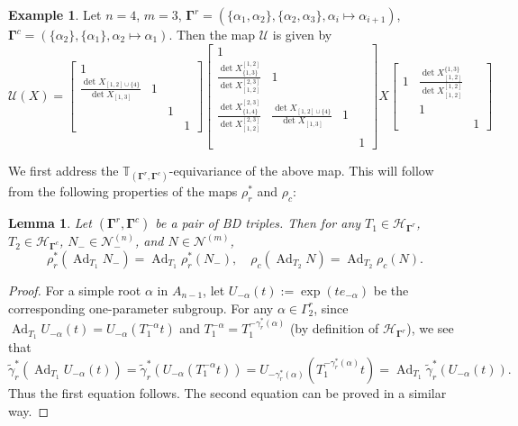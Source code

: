 \documentclass[11pt]{article}
\newcommand{\bg}{\mathbf{\Gamma}}
\DeclareMathOperator{\Ad}{Ad}
\newtheorem{lemma}[theorem]{Lemma}%
\theoremstyle{definition}\newtheorem{definition}[theorem]{Definition}
\theoremstyle{definition}\newtheorem{remark}[theorem]{Remark}
\newtheorem{example}[theorem]{Example}
\theoremstyle{remark}
\numberwithin{equation}{section}
\begin{document}
\begin{example}
    Let $n=4$, $m=3$, $\bg^r = (\{\alpha_1,\alpha_2\},\{\alpha_2,\alpha_3\},\alpha_i \mapsto \alpha_{i+1})$, \mbox{$\bg^c = (\{\alpha_2\},\{\alpha_1\},\alpha_2\mapsto \alpha_1)$}. Then the map $\mathcal{U}$ is given by
    \begin{equation*}
        \mathcal{U}(X) = \begin{bmatrix}
            1 & & &\\
            \frac{\det X_{[1,2]\cup\{4\}}}{\det X_{[1,3]}} & 1 & &\\
            & & 1 &\\
            & & & 1
        \end{bmatrix}
        \begin{bmatrix}
            1 & & &\\
            \frac{\det X_{\{1,3\}}^{[1,2]}}{\det X_{[1,2]}^{[2,3]}} & 1 & &\\[10pt]
            \frac{\det X_{\{1,4\}}^{[2,3]}}{\det X_{[1,2]}^{[2,3]}} &  \frac{\det X_{[1,2]\cup\{4\}}}{\det X_{[1,3]}} & 1 &\\
            & & & 1
        \end{bmatrix}X \begin{bmatrix}
            1 & \frac{\det X_{[1,2]}^{\{1,3\}}}{\det X_{[1,2]}^{[1,2]}} &\\
            & 1 & \\
            & & 1
        \end{bmatrix}
    \end{equation*}
\end{example}

We first address the $\mathbb{T}_{(\bg^r,\bg^c)}$-equivariance of the above map. This will follow from the following properties of the maps $\rho_r^*$ and $\rho_c$:
\begin{lemma}\label{l:T_equiv_rho}
    Let $(\bg^r,\bg^c)$ be a pair of BD triples. Then for any $T_1 \in \mathcal{H}_{\bg^r}$, $T_2 \in \mathcal{H}_{\bg^c}$, $N_- \in \mathcal{N}_-^{(n)}$, and $N \in \mathcal{N}^{(m)}$,
    \begin{equation*}
        \rho_r^*(\Ad_{T_1} N_-) = \Ad_{T_1} \rho_r^*(N_-), \quad \rho_c(\Ad_{T_2} N) = \Ad_{T_2}\rho_c(N).
    \end{equation*}
\end{lemma}
\begin{proof}
For a simple root $\alpha$ in $A_{n-1}$, let $U_{-\alpha}(t):=\exp(t e_{-\alpha})$ be the corresponding one-parameter subgroup. For any $\alpha \in \Gamma_2^r$, since  $\Ad_{T_1} U_{-\alpha}(t) = U_{-\alpha}(T_1^{-\alpha}t)$ and  $T_1^{-\alpha} = T_1^{-\gamma_r^*(\alpha)}$ (by definition of $\mathcal{H}_{\bg^r}$), we see that
\begin{equation*}
    \tilde{\gamma}_r^*(\Ad_{T_1} U_{-\alpha}(t)) = \tilde{\gamma}_r^*(U_{-\alpha}(T_1^{-\alpha}t)) = U_{-\gamma_r^*(\alpha)}(T_1^{-\gamma_r^*(\alpha)}t) = \Ad_{T_1}\tilde{\gamma}_r^*(U_{-\alpha}(t)).
\end{equation*}
Thus the first equation follows. The second equation can be proved in a similar way.
\end{proof}
\end{document}
